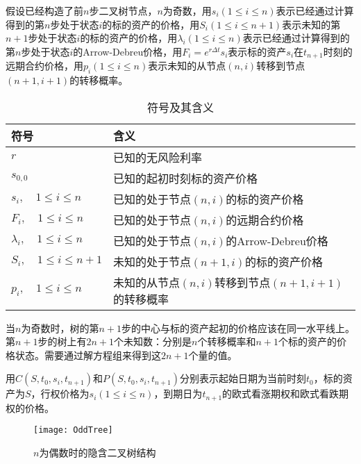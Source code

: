 假设已经构造了前$n$步二叉树节点，$n$为奇数，用$s_i(1\le i\le n)$表示已经通过计算得到的第$n$步处于状态$i$的标的资产的价格，用$S_i(1\le i\le n+1)$表示未知的第$n+1$步处于状态$i$的标的资产的价格，用$\lambda_i(1\le i\le n)$表示已经通过计算得到的第$n$步处于状态$i$的Arrow-Debreu价格，用$F_i = e^{r\Delta t}s_i$表示标的资产$s_i$在$t_{n+1}$时刻的远期合约价格，用$p_i(1\le i\le n)$表示未知的从节点$(n,i)$转移到节点$(n+1,i+1)$的转移概率。
\begin{table}[H]
	\centering
	\caption{符号及其含义}
	\begin{tabular}{|l|l|}
		\hline
		符号 & 含义 \\\hline
		$r$ & 已知的无风险利率 \\\hline
		$s_{0,0}$ & 已知的起初时刻标的资产价格 \\\hline
		$s_i,\quad 1\le i \le n$ & 已知的处于节点$(n,i)$的标的资产价格 \\\hline
		$F_i,\quad 1\le i \le n$ & 已知的处于节点$(n,i)$的远期合约价格 \\\hline
		$\lambda_i,\quad 1\le i \le n$ & 已知的处于节点$(n,i)$的Arrow-Debreu价格 \\\hline
		$S_i,\quad 1\le i \le n+1$ & 未知的处于节点$(n+1,i)$的标的资产价格  \\\hline
		$p_i,\quad 1\le i \le n$ & 未知的从节点$(n,i)$转移到节点$(n+1,i+1)$的转移概率 \\\hline
	\end{tabular}
\end{table}
当$n$为奇数时，树的第$n+1$步的中心与标的资产起初的价格应该在同一水平线上。第$n+1$步的树上有$2n+1$个未知数：分别是$n$个转移概率和$n+1$个标的资产的价格状态。需要通过解方程组来得到这$2n+1$个量的值。

用$C(S,t_0,s_i,t_{n+1})$和$P(S,t_0,s_i,t_{n+1})$分别表示起始日期为当前时刻$t_0$，标的资产为$S$，行权价格为$s_i(1\le i \le n)$，到期日为$t_{n+1}$的欧式看涨期权和欧式看跌期权的价格。
\begin{figure}[H]
	\centering
	\texttt{[image: OddTree]}
	\caption{$n$为偶数时的隐含二叉树结构}
\end{figure}

